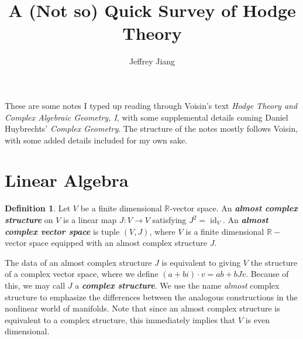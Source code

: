 \documentclass[psamsfonts, 12pt]{amsart}
\theoremstyle{definition}
\newtheorem{defn}[thm]{Definition}
\theoremstyle{remark}
\newcommand{\R}{\mathbb{R}}
\newcommand{\ib}[1]{\textbf{\textit{#1}}}
\DeclareMathOperator{\id}{id}
\begin{document}
%
\author{Jeffrey Jiang}
%
\title{A (Not so) Quick Survey of Hodge Theory}
%
\maketitle
%
These are some notes I typed up reading through Voisin's text \emph{Hodge Theory
and Complex Algebraic Geometry, I}, with some supplemental details coming Daniel
Huybrechts' \emph{Complex Geometry}. The structure of the notes mostly follows Voisin,
with some added details included for my own sake.
%
\tableofcontents
%
\section{Linear Algebra}
%
\begin{defn}
Let $V$ be a finite dimensional $\R$-vector space. An \ib{almost complex structure} on
$V$ is a linear map $J : V \to V$ satisfying $J^2 = \id_V$. An \ib{almost complex
vector space} is tuple $(V,J)$, where $V$ is a finite dimensional $\R-$vector space
equipped with an almost complex structure $J$.
\end{defn}
%
The data of an almost complex structure $J$ is equivalent to giving $V$ the structure
of a complex vector space, where we define $(a + bi)\cdot v = ab + bJv$. Because of this,
we may call $J$ a \ib{complex structure}. We use the name \emph{almost} complex
structure to emphasize the differences between the analogous constructions in the
nonlinear world of manifolds. Note that since an almost complex structure is equivalent
to a complex structure, this immediately implies that $V$ is even dimensional. \\
\end{document}
